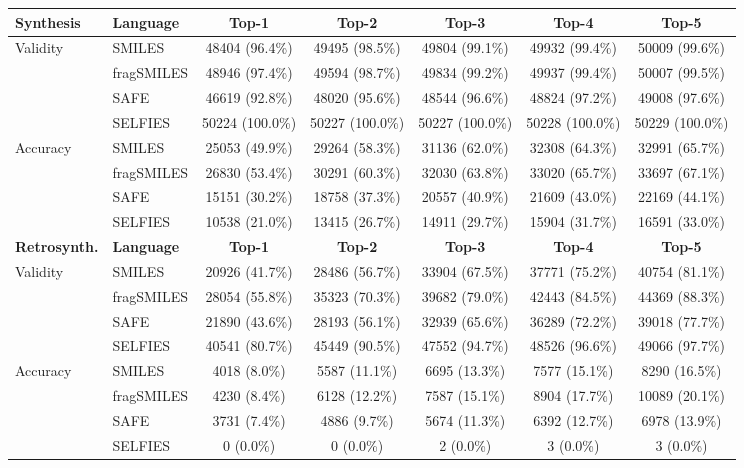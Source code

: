 \begin{tabular}{llccccc}
    \toprule
    \textbf{Synthesis} & \textbf{Language} & \textbf{Top-1} & \textbf{Top-2} & \textbf{Top-3} & \textbf{Top-4} & \textbf{Top-5} \\
    \toprule
    Validity & SMILES & 48404 (96.4\%) & 49495 (98.5\%) & 49804 (99.1\%) & 49932 (99.4\%) & 50009 (99.6\%) \\
    ~ & fragSMILES & 48946 (97.4\%) & 49594 (98.7\%) & 49834 (99.2\%) & 49937 (99.4\%) & 50007 (99.5\%) \\
    ~ & SAFE & 46619 (92.8\%) & 48020 (95.6\%) & 48544 (96.6\%) & 48824 (97.2\%) & 49008 (97.6\%) \\
    ~ & SELFIES & 50224 (100.0\%) & 50227 (100.0\%) & 50227 (100.0\%) & 50228 (100.0\%) & 50229 (100.0\%) \\
    \hline
    Accuracy & SMILES & 25053 (49.9\%) & 29264 (58.3\%) & 31136 (62.0\%) & 32308 (64.3\%) & 32991 (65.7\%) \\
    ~ & fragSMILES & 26830 (53.4\%) & 30291 (60.3\%) & 32030 (63.8\%) & 33020 (65.7\%) & 33697 (67.1\%) \\
    ~ & SAFE & 15151 (30.2\%) & 18758 (37.3\%) & 20557 (40.9\%) & 21609 (43.0\%) & 22169 (44.1\%) \\
    ~ & SELFIES & 10538 (21.0\%) & 13415 (26.7\%) & 14911 (29.7\%) & 15904 (31.7\%) & 16591 (33.0\%) \\
    \toprule
    \textbf{Retrosynth.} &  \textbf{Language} & \textbf{Top-1} & \textbf{Top-2} & \textbf{Top-3} & \textbf{Top-4} & \textbf{Top-5}\\
    \toprule
    Validity & SMILES & 20926 (41.7\%) & 28486 (56.7\%) & 33904 (67.5\%) & 37771 (75.2\%) & 40754 (81.1\%) \\
    ~ & fragSMILES & 28054 (55.8\%) & 35323 (70.3\%) & 39682 (79.0\%) & 42443 (84.5\%) & 44369 (88.3\%) \\
    ~ & SAFE & 21890 (43.6\%) & 28193 (56.1\%) & 32939 (65.6\%) & 36289 (72.2\%) & 39018 (77.7\%) \\
    ~ & SELFIES & 40541 (80.7\%) & 45449 (90.5\%) & 47552 (94.7\%) & 48526 (96.6\%) & 49066 (97.7\%) \\
    \hline
    Accuracy & SMILES & 4018 (8.0\%) & 5587 (11.1\%) & 6695 (13.3\%) & 7577 (15.1\%) & 8290 (16.5\%) \\
    ~ & fragSMILES & 4230 (8.4\%) & 6128 (12.2\%) & 7587 (15.1\%) & 8904 (17.7\%) & 10089 (20.1\%) \\
    ~ & SAFE & 3731 (7.4\%) & 4886 (9.7\%) & 5674 (11.3\%) & 6392 (12.7\%) & 6978 (13.9\%) \\
    ~ & SELFIES & 0 (0.0\%) & 0 (0.0\%) & 2 (0.0\%) & 3 (0.0\%) & 3 (0.0\%) \\
    \bottomrule
\end{tabular}